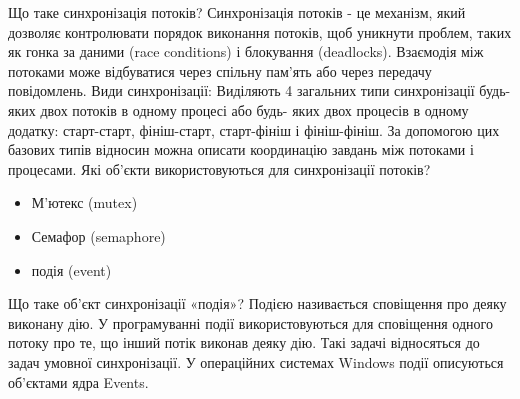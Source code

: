 \documentclass[a4paper, 12pt, oneside]{extarticle}
\begin{document}
\begin{itemize}
	\question Що таке синхронізація потоків?
	\answer Синхронізація потоків - це механізм, який дозволяє контролювати порядок виконання потоків, щоб уникнути проблем, таких як гонка за даними (race conditions) і блокування (deadlocks). Взаємодія між потоками може відбуватися через спільну пам'ять або через передачу повідомлень.
	\question Види синхронізації:
	\answer
Виділяють 4 загальних типи синхронізації будь-яких двох потоків в одному процесі або будь-
яких двох процесів в одному додатку: старт-старт, фініш-старт, старт-фініш і фініш-фініш. За
допомогою цих базових типів відносин можна описати координацію завдань між потоками і
процесами.
	\question Які об’єкти використовуються для синхронізації потоків?
	\answer
		\begin{itemize}
			\item М’ютекс (mutex)
			\item Семафор (semaphore)
			\item подія (event)
		\end{itemize}
	\question Що таке об’єкт синхронізації «подія»?
	\answer Подією називається сповіщення про деяку виконану дію. У програмуванні
події використовуються для сповіщення одного потоку про те, що інший потік
виконав деяку дію. Такі задачі відносяться до задач умовної синхронізації. У
операційних системах Windows події описуються об'єктами ядра Events.
\end{itemize}
\end{document}
